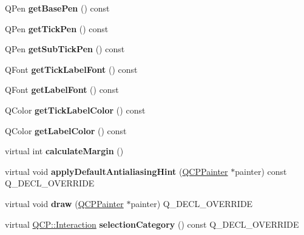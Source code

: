 \begin{DoxyCompactItemize}
Q\+Pen {\bfseries get\+Base\+Pen} () const
\item 
\mbox{\label{class_q_c_p_axis_afe7d57415cbbf31e5549a5cc40b6f8d8}} 
Q\+Pen {\bfseries get\+Tick\+Pen} () const
\item 
\mbox{\label{class_q_c_p_axis_aad7739c229b292ddab0b3a43a5676f54}} 
Q\+Pen {\bfseries get\+Sub\+Tick\+Pen} () const
\item 
\mbox{\label{class_q_c_p_axis_a694ab8b4240f3c90a866372e3dcb364f}} 
Q\+Font {\bfseries get\+Tick\+Label\+Font} () const
\item 
\mbox{\label{class_q_c_p_axis_aeac21c907d2516af9cde9a463043d671}} 
Q\+Font {\bfseries get\+Label\+Font} () const
\item 
\mbox{\label{class_q_c_p_axis_a8d00d5b78ecfbebbea5a8161bddb9a17}} 
Q\+Color {\bfseries get\+Tick\+Label\+Color} () const
\item 
\mbox{\label{class_q_c_p_axis_ae914abd56afa570cb9f2ab50e59c0f0e}} 
Q\+Color {\bfseries get\+Label\+Color} () const
\item 
\mbox{\label{class_q_c_p_axis_a6a84f9634cec70ceb06701ac03039358}} 
virtual int {\bfseries calculate\+Margin} ()
\item 
\mbox{\label{class_q_c_p_axis_a9d6e83cebc1f2b777cb681782653fad6}} 
virtual void {\bfseries apply\+Default\+Antialiasing\+Hint} (\hyperlink{class_q_c_p_painter}{Q\+C\+P\+Painter} $\ast$painter) const Q\+\_\+\+D\+E\+C\+L\+\_\+\+O\+V\+E\+R\+R\+I\+DE
\item 
\mbox{\label{class_q_c_p_axis_a647d98a3f75688b3ec2364c1169dda9e}} 
virtual void {\bfseries draw} (\hyperlink{class_q_c_p_painter}{Q\+C\+P\+Painter} $\ast$painter) Q\+\_\+\+D\+E\+C\+L\+\_\+\+O\+V\+E\+R\+R\+I\+DE
\item 
\mbox{\label{class_q_c_p_axis_a54bf731cab5c943ea5bd6914bc561a31}} 
virtual \hyperlink{namespace_q_c_p_a2ad6bb6281c7c2d593d4277b44c2b037}{Q\+C\+P\+::\+Interaction} {\bfseries selection\+Category} () const Q\+\_\+\+D\+E\+C\+L\+\_\+\+O\+V\+E\+R\+R\+I\+DE

\end{DoxyCompactItemize}
